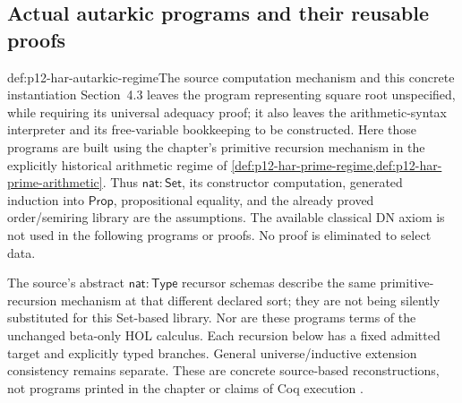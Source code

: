 \subsection{Actual autarkic programs and their reusable proofs}

\begin{hbdefinition}{def:p12-har-autarkic-regime}{The source computation mechanism and this concrete instantiation}
Section~4.3 leaves the program representing square root unspecified,
while requiring its universal adequacy proof; it also leaves the
arithmetic-syntax interpreter and its free-variable bookkeeping to be
constructed. Here those programs are built using the chapter's primitive
recursion mechanism in the explicitly historical arithmetic regime of
\cref{def:p12-har-prime-regime,def:p12-har-prime-arithmetic}.
Thus \(\mathsf{nat}:\mathsf{Set}\), its constructor computation,
generated induction into \(\mathsf{Prop}\), propositional equality,
and the already proved order/semiring library are the assumptions.
The available classical DN axiom is not used in the following programs
or proofs. No proof is eliminated to select data.

The source's abstract \(\mathsf{nat}:\mathsf{Type}\) recursor
schemas describe the same primitive-recursion mechanism at that different
declared sort; they are not being silently substituted for this Set-based
library. Nor are these programs terms of the unchanged beta-only HOL
calculus. Each recursion below has a fixed admitted target and explicitly
typed branches. General universe/inductive extension consistency remains
separate. These are concrete source-based reconstructions, not programs
printed in the chapter or claims of Coq execution
\cite[pp.~1220--1223]{BarendregtGeuvers2001}.
\end{hbdefinition}

